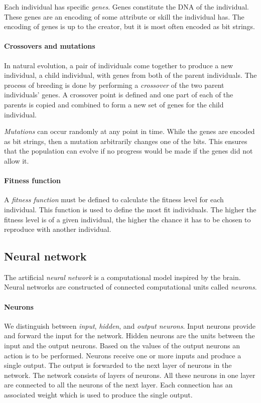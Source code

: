 Each individual has specific \emph{genes}. Genes constitute the DNA of the individual. These genes are an encoding of some attribute or skill the individual has. The encoding of genes is up to the creator, but it is most often encoded as bit strings.

\paragraph{Crossovers and mutations}

In natural evolution, a pair of individuals come together to produce a new individual, a child individual, with genes from both of the parent individuals. The process of breeding is done by performing a \emph{crossover} of the two parent individuals' genes. A crossover point is defined and one part of each of the parents is copied and combined to form a new set of genes for the child individual.


\emph{Mutations} can occur randomly at any point in time. While the genes are encoded as bit strings, then a mutation arbitrarily changes one of the bits. This ensures that the population can evolve if no progress would be made if the genes did not allow it.

\paragraph{Fitness function}

A \emph{fitness function} must be defined to calculate the fitness level for each individual. This function is used to define the most fit individuals. The higher the fitness level is of a given individual, the higher the chance it has to be chosen to reproduce with another individual.

\subsection{Neural network}

The artificial \emph{neural network} is a computational model inspired by the brain. Neural networks are constructed of connected computational units called \emph{neurons}.

\paragraph{Neurons}

We distinguish between \emph{input}, \emph{hidden}, and \emph{output neurons}. Input neurons provide and forward the input for the network. Hidden neurons are the units between the input and the output neurons. Based on the values of the output neurons an action is to be performed. Neurons receive one or more inputs and produce a single output. The output is forwarded to the next layer of neurons in the network.  The network consists of layers of neurons. All these neurons in one layer are connected to all the neurons of the next layer. Each connection has an associated weight which is used to produce the single output.

